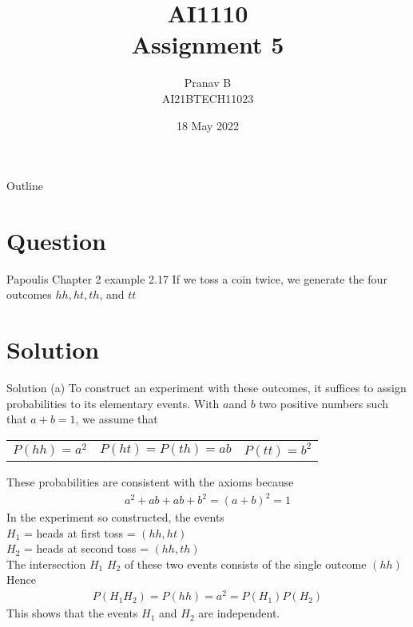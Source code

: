 \documentclass{beamer}
\title{AI1110 \\ Assignment 5}
\author{Pranav B \\ AI21BTECH11023}
\date{18 May 2022}
\begin{document}
	\begin{frame}
		\titlepage
	\end{frame}
	
	\begin{frame}{Outline}
    		\tableofcontents
	\end{frame}
	
	\section{Question}
	\begin{frame}{ Papoulis Chapter 2 example 2.17}
	If we toss a coin twice, we generate the four outcomes $hh,ht,th$, and $tt$ 
	\end{frame}
	\section{Solution}
	\begin{frame}{Solution}
	(a) To construct an experiment with these outcomes, it suffices to assign probabilities to its elementary events. With $a$and $b$ two positive numbers such that $a + b = 1$,
we assume that\\
\begin{table}[ht!]
\begin{tabular}{c c c}
$P(hh) = a^2$ & $P(ht) = P(th) = ab$ & $P(tt) = b^2$
\end{tabular}
\end{table}
These probabilities are consistent with the axioms because
\begin{align}
a^2+ab+ab +b^2 = (a+b)^2 = 1
\end{align}
In the experiment so constructed, the events\\
$H_1$ = {heads at first toss} = $(hh,ht)$\\
$H_2$ = {heads at second toss} = $(hh,th)$\\
The intersection $H_1$ $H_2$ of these two events consists of the single outcome $(hh)$
Hence\\
\begin{align}
P(H_1 H_2) = P(hh) = a^2 = P(H_1 )P(H_2)
\end{align}
This shows that the events $H_1$ and $H_2$ are independent.
\end{frame}
\end{document}
